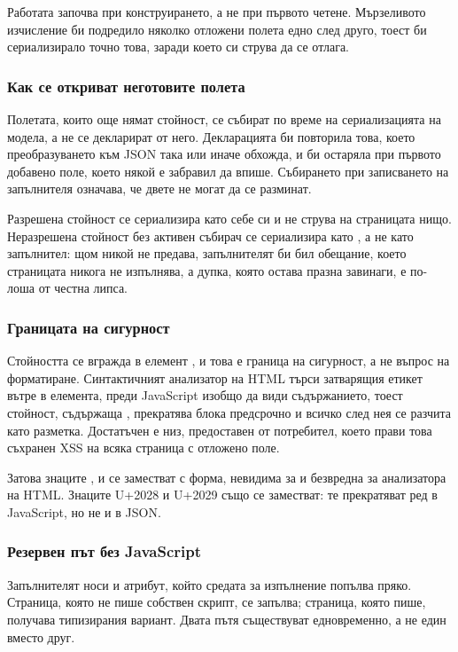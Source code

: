 Работата започва при конструирането, а не при първото четене. Мързеливото изчисление би
подредило няколко отложени полета едно след друго, тоест би сериализирало точно това,
заради което си струва да се отлага.

\subsubsection{Как се откриват неготовите полета}

Полетата, които още нямат стойност, се събират по време на сериализацията на модела, а не
се декларират от него. Декларацията би повторила това, което преобразуването към JSON така
или иначе обхожда, и би остаряла при първото добавено поле, което някой е забравил да
впише. Събирането при записването на запълнителя означава, че двете не могат да се
разминат.

Разрешена стойност се сериализира като себе си и не струва на страницата нищо. Неразрешена
стойност без активен събирач се сериализира като , а не като запълнител: щом
никой не предава, запълнителят би бил обещание, което страницата никога не изпълнява, а
дупка, която остава празна завинаги, е по-лоша от честна липса.

\subsubsection{Границата на сигурност}

Стойността се вгражда в елемент , и това е граница на сигурност, а не въпрос
на форматиране. Синтактичният анализатор на HTML търси затварящия етикет вътре в елемента,
преди JavaScript изобщо да види съдържанието, тоест стойност, съдържаща ,
прекратява блока предсрочно и всичко след нея се разчита като разметка. Достатъчен е низ,
предоставен от потребител, което прави това съхранен XSS на всяка страница с отложено поле.

Затова знаците \code{<}, \code{>} и \code{\&} се заместват с 
форма, невидима за  и безвредна за анализатора на HTML. Знаците U+2028 и
U+2029 също се заместват: те прекратяват ред в JavaScript, но не и в JSON.

\subsubsection{Резервен път без JavaScript}

Запълнителят носи и атрибут, който средата за изпълнение попълва пряко. Страница, която не
пише собствен скрипт, се запълва; страница, която пише, получава типизирания вариант.
Двата пътя съществуват едновременно, а не един вместо друг.

